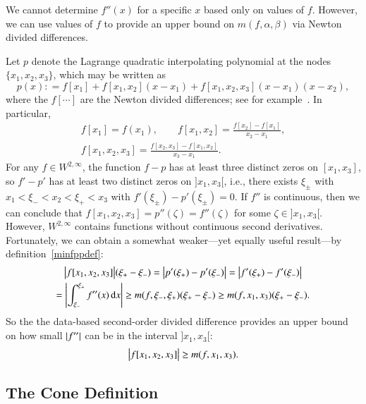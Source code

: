 \documentclass[review]{elsarticle}
\theoremstyle{definition}
\renewcommand{\cw}{W}
\begin{document}
We cannot determine $f''(x)$ for a specific $x$ based only on values of $f$. However,
we can use values of $f$ to provide an upper bound on $m(f,\alpha, \beta)$ via Newton divided differences.

Let $p$ denote the Lagrange quadratic interpolating polynomial at the nodes
$\{x_1, x_2, x_3\}$, which may be written as
\begin{equation*}
p(x) : = f[x_1] + f[x_1, x_2](x-x_1) + f[x_1, x_2, x_3](x-x_1)(x-x_2),
\end{equation*}
where the $f[\cdots]$ are the Newton divided differences; see for example~\cite{CheKin12a}. In particular,
\begin{gather}
\nonumber
f[x_1] = f(x_1), \qquad f[x_1, x_2] = \frac{f[x_2] - f[x_1]}{x_2-x_1},  \\
f[x_1, x_2,x_3] = \frac{f[x_2,x_3] - f[x_1,x_2]}{x_3-x_1}. \label{divdiff}
\end{gather}
For any $f \in
\cw^{2,\infty}$, the function $f - p$ has at least three distinct zeros on
$[x_1, x_3]$, so $f' - p'$ has at least two distinct zeros on $]x_1, x_3[$,
i.e., there exists $\xi_\pm$ with $x_1 < \xi_- < x_2 < \xi_+ < x_3$ with
$f'(\xi_\pm) - p'(\xi_{\pm}) = 0$. If $f''$ is continuous, then we can conclude
that $ f[x_1, x_2, x_3]= p''(\zeta) =f''(\zeta) $ for some $\zeta \in ]x_1,
x_3[$. However, $\cw^{2,\infty}$ contains functions without continuous
second derivatives. Fortunately, we can obtain a somewhat weaker---yet equally useful result---by  definition~\eqref{minfppdef}:
\begin{multline*}
\bigl \lvert f[x_1, x_2, x_3] \bigr \rvert(\xi_+  - \xi_-) = \left \lvert p'(\xi_+) - p'(\xi_-) \right \rvert =  \left \lvert f'(\xi_+) - f'(\xi_-) \right \rvert \\
= \left \lvert \int_{\xi_-}^{\xi_+} f''(x) \, {\rm d} x \right \rvert \ge m(f,\xi_-, \xi_+) (\xi_+  - \xi_-)  \ge m(f,x_1, x_3) (\xi_+  - \xi_-) .
\end{multline*}
So the the data-based second-order divided difference provides an upper
bound on how small $\left \lvert f'' \right \rvert$ can be in the interval $]x_1, x_3[$:
\begin{equation} \label{NDDbdm}
\bigl \lvert f[x_1, x_2, x_3] \bigr \rvert \ge m(f,x_1, x_3).
\end{equation}

\subsection{The Cone Definition}  \label{sec:conedef}
\end{document}
